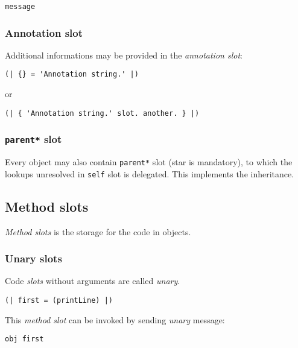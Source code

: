 \documentclass[10pt]{article}
\begin{document}
\begin{multicols*}{3}
\begin{lstlisting}
message
\end{lstlisting}



\subsubsection{Annotation slot}

Additional informations may be provided in the \textit{annotation slot}:

\begin{lstlisting}
(| {} = 'Annotation string.' |)
\end{lstlisting}

or

\begin{lstlisting}
(| { 'Annotation string.' slot. another. } |)
\end{lstlisting}



\subsubsection{\texttt{parent*} slot}
Every object may also contain \texttt{parent*} slot (star is mandatory), to which the lookups unresolved in \texttt{self} slot is delegated. This implements the inheritance.




\subsection{Method slots}

\textit{Method slots} is the storage for the code in objects.



\subsubsection{Unary slots}
Code \textit{slots} without arguments are called \textit{unary}.

\begin{lstlisting}
(| first = (printLine) |)
\end{lstlisting}

This \textit{method slot} can be invoked by sending \textit{unary} message:

\begin{lstlisting}
obj first
\end{lstlisting}




\end{multicols*}
\end{document}
